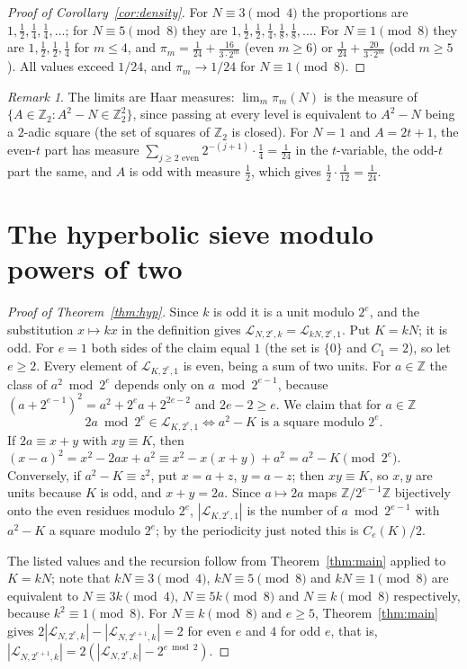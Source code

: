 \documentclass[11pt]{amsart}
\theoremstyle{remark}
\newtheorem{remark}[theorem]{Remark}
\newcommand{\Z}{\mathbb{Z}}
\newcommand{\Lset}{\mathcal{L}}
\begin{document}
\begin{proof}[Proof of Corollary~\ref{cor:density}]
For $N\equiv3\pmod4$ the proportions are $1,\tfrac12,\tfrac14,\tfrac14,\dots$; for $N\equiv5\pmod 8$ they are $1,\tfrac12,\tfrac12,\tfrac14,\tfrac18,\tfrac18,\dots$. For $N\equiv1\pmod8$ they are $1,\tfrac12,\tfrac12,\tfrac14$ for $m\le4$, and $\pi_m=\tfrac1{24}+\tfrac{16}{3\cdot2^m}$ (even $m\ge6$) or $\tfrac1{24}+\tfrac{20}{3\cdot2^m}$ (odd $m\ge5$). All values exceed $1/24$, and $\pi_m\to1/24$ for $N\equiv1\pmod 8$.
\end{proof}

\begin{remark}
The limits are Haar measures: $\lim_m\pi_m(N)$ is the measure of $\{A\in\Z_2 : A^2-N\in\Z_2^2\}$, since passing at every level is equivalent to $A^2-N$ being a $2$-adic square (the set of squares of $\Z_2$ is closed). For $N=1$ and $A=2t+1$, the even-$t$ part has measure $\sum_{j\ge2\text{ even}}2^{-(j+1)}\cdot\tfrac14=\tfrac1{24}$ in the $t$-variable, the odd-$t$ part the same, and $A$ is odd with measure $\tfrac12$, which gives $\tfrac12\cdot\tfrac1{12}=\tfrac1{24}$.
\end{remark}

\section{The hyperbolic sieve modulo powers of two}

\begin{proof}[Proof of Theorem~\ref{thm:hyp}]
Since $k$ is odd it is a unit modulo $2^e$, and the substitution $x\mapsto kx$ in the definition gives $\Lset_{N,2^e,k}=\Lset_{kN,2^e,1}$. Put $K=kN$; it is odd. For $e=1$ both sides of the claim equal $1$ (the set is $\{0\}$ and $C_1=2$), so let $e\ge2$. Every element of $\Lset_{K,2^e,1}$ is even, being a sum of two units. For $a\in\Z$ the class of $a^2 \bmod 2^e$ depends only on $a\bmod 2^{e-1}$, because $(a+2^{e-1})^2=a^2+2^ea+2^{2e-2}$ and $2e-2\ge e$. We claim that for $a\in\Z$
\[
2a \bmod 2^e\in\Lset_{K,2^e,1}\iff a^2-K \text{ is a square modulo } 2^e .
\]
If $2a\equiv x+y$ with $xy\equiv K$, then $(x-a)^2=x^2-2ax+a^2\equiv x^2-x(x+y)+a^2=a^2-K\pmod{2^e}$. Conversely, if $a^2-K\equiv z^2$, put $x=a+z$, $y=a-z$; then $xy\equiv K$, so $x,y$ are units because $K$ is odd, and $x+y=2a$. Since $a\mapsto 2a$ maps $\Z/2^{e-1}\Z$ bijectively onto the even residues modulo $2^e$, $|\Lset_{K,2^e,1}|$ is the number of $a\bmod2^{e-1}$ with $a^2-K$ a square modulo $2^e$; by the periodicity just noted this is $C_e(K)/2$.

The listed values and the recursion follow from Theorem~\ref{thm:main} applied to $K=kN$; note that $kN\equiv3\pmod4$, $kN\equiv5\pmod8$ and $kN\equiv1\pmod8$ are equivalent to $N\equiv3k\pmod 4$, $N\equiv5k\pmod8$ and $N\equiv k\pmod8$ respectively, because $k^2\equiv1\pmod8$. For $N\equiv k\pmod 8$ and $e\ge5$, Theorem~\ref{thm:main} gives $2|\Lset_{N,2^e,k}|-|\Lset_{N,2^{e+1},k}|=2$ for even $e$ and $4$ for odd $e$, that is, $|\Lset_{N,2^{e+1},k}|=2(|\Lset_{N,2^e,k}|-2^{e\bmod2})$.
\end{proof}
\end{document}
